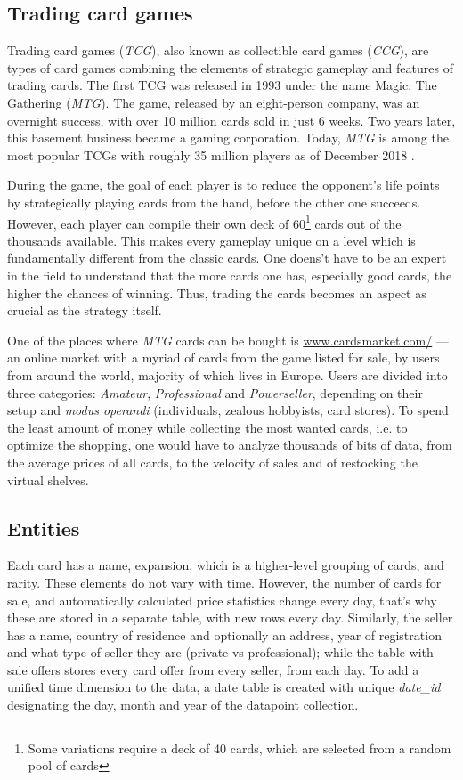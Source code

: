 \subsection{Trading card games}
Trading card games (\textit{TCG}), also known as collectible card games (\textit{CCG}), are types of card games combining the elements of strategic gameplay and features of trading cards.
The first TCG was released in 1993 under the name Magic: The Gathering (\textit{MTG}). The game, released by an eight-person company, was an overnight success, with over 10 million cards sold in just 6 weeks.
Two years later, this basement business became a gaming corporation. Today, \textit{MTG} is among the most popular TCGs with roughly 35 million players as of December 2018 \cite{magicTheGathering}. \par
During the game, the goal of each player is to reduce the opponent's life points by strategically playing cards from the hand, before the other one succeeds. However, each player can compile their own deck of 60\footnote{Some variations require a deck of 40 cards, which are selected from a random pool of cards} cards out of the thousands available. This makes every gameplay unique on a level which is fundamentally different from the classic cards. One doens't have to be an expert in the field to understand that the more cards one has, especially good cards, the higher the chances of winning. Thus, trading the cards becomes an aspect as crucial as the strategy itself. \par
One of the places where \textit{MTG} cards can be bought is \url{www.cardsmarket.com/} --- an online market with a myriad of cards from the game listed for sale, by users from around the world, majority of which lives in Europe. Users are divided into three categories: \textit{Amateur}, \textit{Professional} and \textit{Powerseller}, depending on their setup and \textit{modus operandi} (individuals, zealous hobbyists, card stores). To spend the least amount of money while collecting the most wanted cards, i.e. to optimize the shopping, one would have to analyze thousands of bits of data, from the average prices of all cards, to the velocity of sales and of restocking the virtual shelves.

\subsection{Entities}
Each card has a name, expansion, which is a higher-level grouping of cards, and rarity. These elements do not vary with time. However, the number of cards for sale, and automatically calculated price statistics change every day, that's why these are stored in a separate table, with new rows every day. Similarly, the seller has a name, country of residence and optionally an address, year of registration and what type of seller they are (private vs professional); while the table with sale offers stores every card offer from every seller, from each day. To add a unified time dimension to the data, a date table is created with unique \textit{date\_id} designating the day, month and year of the datapoint collection.

